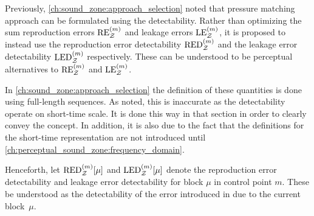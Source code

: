 

Previously, \autoref{ch:sound_zone:approach_selection} noted that pressure matching approach can be formulated using the detectability.
Rather than optimizing the sum reproduction errors $\text{RE}^{(m)}_{\mathcal{Z}}$ and leakage errors $\text{LE}^{(m)}_{\mathcal{Z}}$, it is proposed to instead use
the reproduction error detectability $\text{RED}^{(m)}_{\mathcal{Z}}$ and the leakage error detectability $\text{LED}^{(m)}_{\mathcal{Z}}$ respectively.
These can be understood to be perceptual alternatives to $\text{RE}^{(m)}_{\mathcal{Z}}$ and $\text{LE}^{(m)}_{\mathcal{Z}}$.

In \autoref{ch:sound_zone:approach_selection} the definition of these quantities is done using full-length sequences.
As noted, this is inaccurate as the detectability operate on short-time scale.
It is done this way in that section in order to clearly convey the concept. 
In addition, it is also due to the fact that the definitions for the short-time representation are not introduced until 
\autoref{ch:perceptual_sound_zone:frequency_domain}. 

Henceforth, let $\text{RED}^{(m)}_{\mathcal{Z}}[\mu]$ and $\text{LED}^{(m)}_{\mathcal{Z}}[\mu]$ denote the reproduction error detectability and  
leakage error detectability for block $\mu$ in control point $m$. 
These be understood as the detectability of the error introduced in due to the current block~$\mu$.  

